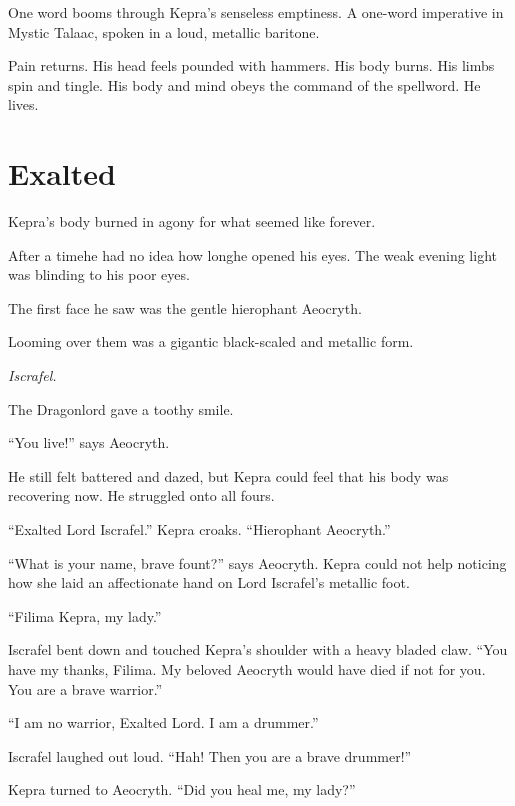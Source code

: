 \documentclass
  [a4paper,
   12pt,
   oneside
  ]%
  {article}
\begin{document}
One word booms through Kepra’s senseless emptiness. 
A one-word imperative in Mystic Talaac, spoken in a loud, metallic baritone. 

Pain returns. 
His head feels pounded with hammers. 
His body burns. 
His limbs spin and tingle. %
His body and mind obeys the command of the spellword. 
He lives.



\section{Exalted}
Kepra's body burned in agony for what seemed like forever. 

After a time\dash{}he had no idea how long\dash{}he opened his eyes. 
The weak evening light was blinding to his poor eyes. 

The first face he saw was the gentle hierophant Aeocryth. 

Looming over them was a gigantic black-scaled and metallic form.

\emph{Iscrafel.}


The Dragonlord gave a toothy smile.

``You live!'' says Aeocryth. 

He still felt battered and dazed, but Kepra could feel that his body was recovering now. 
He struggled onto all fours. 

``Exalted Lord Iscrafel.'' Kepra croaks. ``Hierophant Aeocryth.''

``What is your name, brave fount?'' says Aeocryth. Kepra could not help noticing how she laid an affectionate hand on Lord Iscrafel’s metallic foot.

``Filima Kepra, my lady.'' 

Iscrafel bent down and touched Kepra's shoulder with a heavy bladed claw. 
``You have my thanks, Filima. My beloved Aeocryth would have died if not for you. You are a brave warrior.'' 

``I am no warrior, Exalted Lord. I am a drummer.''

Iscrafel laughed out loud. ``Hah! Then you are a brave drummer!'' 

Kepra turned to Aeocryth. ``Did you heal me, my lady?''
\end{document}
